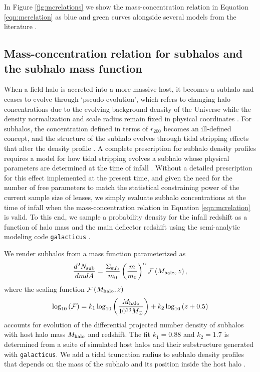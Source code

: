 In Figure \ref{fig:mcrelations} we show the mass-concentration relation in Equation \ref{eqn:mcrelation} as blue and green curves alongside several models from the literature \cite{Bullock++01,Prada++12,Ludlow++16,DiemerJoyce18}. 

\subsection{Mass-concentration relation for subhalos and the subhalo mass function}

When a field halo is accreted into a more massive host, it becomes a subhalo and ceases to evolve through `pseudo-evolution', which refers to changing halo concentrations due to the evolving background density of the Universe while the density normalization and scale radius remain fixed in physical coordinates \cite{Diemer++13}. For subhalos, the concentration defined in terms of $r_{200}$ becomes an ill-defined concept, and the structure of the subhalo evolves through tidal stripping effects that alter the density profile \cite{Errani++17}. A complete prescription for subhalo density profiles requires a model for how tidal stripping evolves a subhalo whose physical parameters are determined at the time of infall \cite{GreenvandenBosch19}. Without a detailed prescription for this effect implemented at the present time, and given the need for the number of free parameters to match the statistical constraining power of the current sample size of lenses, we simply evaluate subhalo concentrations at the time of infall when the mass-concentration relation in Equation \ref{eqn:mcrelation} is valid. To this end, we sample a probability density for the infall redshift as a function of halo mass and the main deflector redshift using the semi-analytic modeling code {\tt{galacticus}} \cite{Benson12}. 

We render subhalos from a mass function parameterized as 
\begin{equation}
\label{eqn:subhalomfunc}
\frac{d^2 N_{\rm{sub}}}{dm dA} =  \frac{\Sigma_{\rm{sub}}}{m_0} \left(\frac{m}{m_0}\right)^{\alpha} {\mathcal{F}} \left(M_{\rm{halo}}, z\right),
\end{equation}
where the scaling function $\mathcal{F} \left(M_{\rm{halo}}, z\right)$ 
\begin{equation}
\label{eqn:scaling}
\log_{10} \left(\mathcal{F}\right) = k_1 \log_{10} \left(\frac{M_{\rm{halo}}}{10^{13} {M_{\odot}}}\right) + k_2 \log_{10}\left(z+0.5\right)
\end{equation}
accounts for evolution of the differential projected number density of subhalos with host halo mass $M_{\rm{halo}}$ and redshift. The fit $k_1 = 0.88$ and $k_2 = 1.7$ is determined from a suite of simulated host halos and their substructure generated with {\tt{galacticus}}. We add a tidal truncation radius to subhalo density profiles that depends on the mass of the subhalo and its position inside the host halo \cite{Gilman++19b}. 

